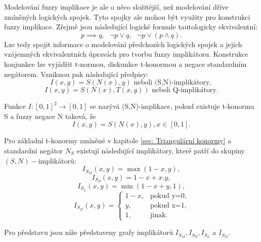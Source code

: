 Modelov\'an\'i fuzzy implikace je ale o něco složitější, než modelov\'an\'i dříve zmíněných logických spojek. Tyto spojky ale mohou být využity pro konstrukci fuzzy implikace. Zřejmě jsou následující logické formule tautologicky ekvivalentní: $$ p\implies q, \mbox{   } \neg p \vee q, \mbox{   } \neg p\vee (p\wedge q) .$$ Lze tedy spojit informace o modelov\'an\'i p\v redchozích logických spojek a jejich vzájemných ekvivalentních \' upravách pro tvorbu fuzzy implikátoru. Konstrukce konjunkce lze vyjádřit t-normou, diskunkce t-konormou a negace standardn\'im negátorem. Vzniknou pak n\'asleduj\'ic\'i p\v redpisy:
$$I(x,y)=S(N(x),y)\text{ neboli (S,N)-implikátory},$$
$$I(x,y)=S(N(x),T(x,y)) \text{ neboli Q-implikátory}.$$

\begin{definition}
    \cite{Springer}
    Funkce $I: [0,1]^2 \rightarrow [0,1]$ se nazývá (S,N)-implikace, pokud existuje t-konorma S a fuzzy negace N taková, že $$I(x,y) = S(N(x),y), x \in [0,1].$$
\end{definition}

\begin{example}
\cite{Springer}
Pro základní t-konormy zmíněné v kapitole \ref{sec: Triangulární konormy} a standardní negátor $N_S$ existují následující implikátory, které patří do skupiny $(S,N)-$implikátor\r u:\\
    \vbox{$$ I_{S_M}(x,y)=\max(1-x,y),$$ }
\vbox{$$ I_{S_P}(x,y)=1-x+x.y,$$}
 \vbox{$$ I_{S_L}(x,y)=\min(1-x+y,1),$$}
 $$ I_{S_D}(x,y)=\begin{cases} 1-x,
&\mbox {pokud y=0,} \\y, &\mbox {pokud x=1}, \\
1, &\mbox {jinak.} \end{cases} $$
\end{example}

Pro představu jsou níže představeny grafy implikátorů $I_{S_M}, I_{S_P}, I_{S_L}$ a $I_{S_D}.$



